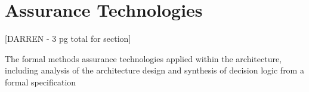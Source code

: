 \section{Assurance Technologies}
\label{sec:assurance}

[DARREN - 3 pg total for section]

The formal methods assurance technologies applied within the architecture, 
including analysis of the architecture design and synthesis of decision logic from a formal specification


